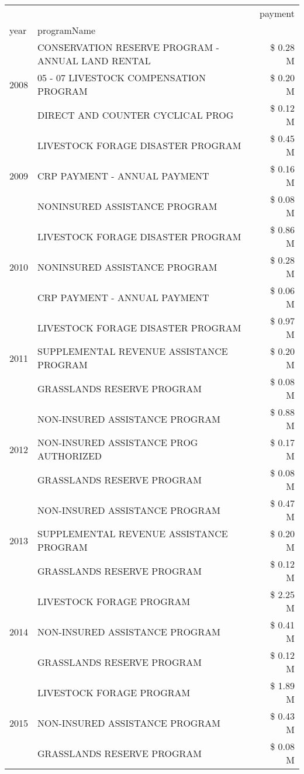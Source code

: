 \begin{tabular}{llr}
\toprule
 &  & payment \\
year & programName &  \\
\midrule
\multirow[t]{3}{*}{2008} & CONSERVATION RESERVE PROGRAM - ANNUAL LAND RENTAL & \$ 0.28 M \\
 & 05 - 07 LIVESTOCK COMPENSATION PROGRAM & \$ 0.20 M \\
 & DIRECT AND COUNTER CYCLICAL PROG & \$ 0.12 M \\
\cline{1-3}
\multirow[t]{3}{*}{2009} & LIVESTOCK FORAGE DISASTER  PROGRAM & \$ 0.45 M \\
 & CRP PAYMENT - ANNUAL PAYMENT & \$ 0.16 M \\
 & NONINSURED ASSISTANCE PROGRAM & \$ 0.08 M \\
\cline{1-3}
\multirow[t]{3}{*}{2010} & LIVESTOCK FORAGE DISASTER  PROGRAM & \$ 0.86 M \\
 & NONINSURED ASSISTANCE PROGRAM & \$ 0.28 M \\
 & CRP PAYMENT - ANNUAL PAYMENT & \$ 0.06 M \\
\cline{1-3}
\multirow[t]{3}{*}{2011} & LIVESTOCK FORAGE DISASTER PROGRAM & \$ 0.97 M \\
 & SUPPLEMENTAL REVENUE ASSISTANCE PROGRAM & \$ 0.20 M \\
 & GRASSLANDS RESERVE PROGRAM & \$ 0.08 M \\
\cline{1-3}
\multirow[t]{3}{*}{2012} & NON-INSURED ASSISTANCE PROGRAM & \$ 0.88 M \\
 & NON-INSURED ASSISTANCE PROG AUTHORIZED & \$ 0.17 M \\
 & GRASSLANDS RESERVE PROGRAM & \$ 0.08 M \\
\cline{1-3}
\multirow[t]{3}{*}{2013} & NON-INSURED ASSISTANCE PROGRAM & \$ 0.47 M \\
 & SUPPLEMENTAL REVENUE ASSISTANCE PROGRAM & \$ 0.20 M \\
 & GRASSLANDS RESERVE PROGRAM & \$ 0.12 M \\
\cline{1-3}
\multirow[t]{3}{*}{2014} & LIVESTOCK FORAGE PROGRAM & \$ 2.25 M \\
 & NON-INSURED ASSISTANCE PROGRAM & \$ 0.41 M \\
 & GRASSLANDS RESERVE PROGRAM & \$ 0.12 M \\
\cline{1-3}
\multirow[t]{3}{*}{2015} & LIVESTOCK FORAGE PROGRAM & \$ 1.89 M \\
 & NON-INSURED ASSISTANCE PROGRAM & \$ 0.43 M \\
 & GRASSLANDS RESERVE PROGRAM & \$ 0.08 M \\

\end{tabular}
